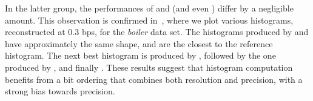 In the latter group, the performances of \swav and \shsg (and even \shop) differ by a negligible
amount. This observation is confirmed in~, where we plot various
histograms, reconstructed at 0.3 bps, for the \emph{boiler} data set. The histograms produced by
\swav and \shsg have approximately the same shape, and are the closest to the reference histogram.
The next best histogram is produced by \slvl, followed by the one produced by \sbit, and finally
\smag. These results suggest that histogram computation benefits from a bit ordering that combines
both resolution and precision, with a strong bias towards precision.
